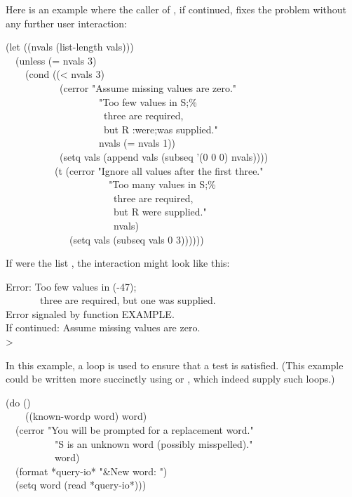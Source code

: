 \begin{defun}[Function]
Here is an example where the caller of , if continued,
fixes the problem without any further user interaction:
\begin{lisp}
(let ((nvals (list-length vals))) \\
~~(unless (= nvals 3) \\
~~~~(cond ((< nvals 3) \\
~~~~~~~~~~~(cerror "Assume missing values are zero." \\
~~~~~~~~~~~~~~~~~~~"Too few values in {\Xtilde}S;{\Xtilde}\%{\Xtilde} \\
~~~~~~~~~~~~~~~~~~~~three are required, {\Xtilde} \\
~~~~~~~~~~~~~~~~~~~~but {\Xtilde}R {\Xtilde}:{\Xlbracket}were{\Xtilde};was{\Xtilde}{\Xrbracket} supplied." \\
~~~~~~~~~~~~~~~~~~~nvals (= nvals 1)) \\
~~~~~~~~~~~(setq vals (append vals (subseq '(0 0 0) nvals)))) \\
~~~~~~~~~~(t (cerror "Ignore all values after the first three." \\
~~~~~~~~~~~~~~~~~~~~~"Too many values in {\Xtilde}S;{\Xtilde}\%{\Xtilde} \\
~~~~~~~~~~~~~~~~~~~~~~three are required, {\Xtilde} \\
~~~~~~~~~~~~~~~~~~~~~~but {\Xtilde}R were supplied." \\
~~~~~~~~~~~~~~~~~~~~~~nvals) \\
~~~~~~~~~~~~~(setq vals (subseq vals 0 3))))))
\end{lisp}
If  were the list , the interaction might look
like this:
\begin{lisp}
Error: Too few values in (-47); \\
~~~~~~~three are required, but one was supplied. \\
Error signaled by function EXAMPLE. \\
If continued: Assume missing values are zero. \\
>
\end{lisp}
In this example, a loop is used to ensure that a test is satisfied.
(This example could be written more succinctly using 
or , which indeed supply such loops.)
\begin{lisp}
(do () \\
~~~~((known-wordp word) word) \\
~~(cerror "You will be prompted for a replacement word." \\
~~~~~~~~~~"{\Xtilde}S is an unknown word (possibly misspelled)." \\
~~~~~~~~~~word) \\
~~(format *query-io* "{\Xtilde}\&New word: ") \\
~~(setq word (read *query-io*)))
\end{lisp}


\end{defun}

